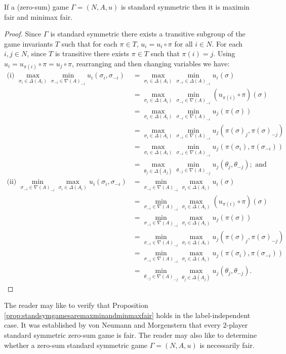 \begin{proposition} \label{prop:standsymgamesaremaxminandminmaxfair}
	If a (zero-sum) game $\Gamma = (N, A, u)$ is standard symmetric then it is maximin fair and minimax fair.
	
	\begin{proof}
		Since $\Gamma$ is standard symmetric there exists a transitive subgroup of the game invariants $T$ such that for each $\pi \in T$, $u_i = u_i \circ \pi$ for all $i \in N$. For each $i, j \in N$, since $T$ is transitive there exists $\pi \in T$ such that $\pi(i) = j$. Using $u_i = u_{\pi(i)} \circ \pi = u_j \circ \pi$, rearranging and then changing variables we have:
		\begin{align*}
			\text{(i) }\max_{\sigma_i \in \Delta(A_i)}\min_{\sigma_{-i} \in {\nabla(A)}_{-i}} u_i(\sigma_i, \sigma_{-i}) &= \max_{\sigma_i \in \Delta(A_i)}\min_{\sigma_{-i} \in \Delta(A)_{-i}} u_i(\sigma) \\
			&= \max_{\sigma_i \in \Delta(A_i)}\min_{\sigma_{-i} \in {\nabla(A)}_{-i}} (u_{\pi(i)} \circ \pi)(\sigma) \\
			&= \max_{\sigma_i \in \Delta(A_i)}\min_{\sigma_{-i} \in {\nabla(A)}_{-i}} u_j\left(\pi(\sigma)\right) \\
			&= \max_{\sigma_i \in \Delta(A_i)}\min_{\sigma_{-i} \in {\nabla(A)}_{-i}} u_j\left(\pi(\sigma)_j, \pi(\sigma)_{-j}\right) \\
			&= \max_{\sigma_i \in \Delta(A_i)}\min_{\sigma_{-i} \in {\nabla(A)}_{-i}} u_j\left(\pi(\sigma_i), \pi(\sigma_{-i})\right) \\
			&= \max_{\theta_j \in \Delta(A_j)}\min_{\theta_{-j} \in {\nabla(A)}_{-j}} u_j(\theta_j, \theta_{-j}); \text{ and} \\
			\text{(ii) }\min_{\sigma_{-i} \in {\nabla(A)}_{-i}}\max_{\sigma_i \in \Delta(A_i)} u_i(\sigma_i, \sigma_{-i}) &= \min_{\sigma_{-i} \in {\nabla(A)}_{-i}}\max_{\sigma_i \in \Delta(A_i)} u_i(\sigma) \\
			&= \min_{\sigma_{-i} \in {\nabla(A)}_{-i}}\max_{\sigma_i \in \Delta(A_i)} (u_{\pi(i)} \circ \pi)(\sigma) \\
			&= \min_{\sigma_{-i} \in {\nabla(A)}_{-i}}\max_{\sigma_i \in \Delta(A_i)} u_j\left(\pi(\sigma)\right) \\
			&= \min_{\sigma_{-i} \in {\nabla(A)}_{-i}}\max_{\sigma_i \in \Delta(A_i)} u_j\left(\pi(\sigma)_j, \pi(\sigma)_{-j}\right) \\
			&= \min_{\sigma_{-i} \in {\nabla(A)}_{-i}}\max_{\sigma_i \in \Delta(A_i)} u_j\left(\pi(\sigma_i), \pi(\sigma_{-i})\right) \\
			&= \min_{\theta_{-j} \in {\nabla(A)}_{-j}}\max_{\theta_j \in \Delta(A_j)} u_j(\theta_j, \theta_{-j}). 
		\end{align*} 
	\end{proof}
\end{proposition}

The reader may like to verify that Proposition \ref{prop:standsymgamesaremaxminandminmaxfair} holds in the label-independent case. It was established by von Neumann and Morgenstern \cite[Pages 165-166]{VNM} that every $2$-player standard symmetric zero-sum game is fair. The reader may also like to determine whether a zero-sum standard symmetric game $\Gamma = (N, A, u)$ is necessarily fair.
